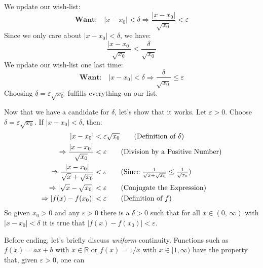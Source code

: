 \documentclass{article}
\theoremstyle{normal}
\theoremstyle{plain}
\begin{document}
    We update our wish-list:
    \begin{equation}
        \textbf{Want:}\quad
        |x-x_{0}|<\delta
        \Rightarrow
        \frac{|x-x_{0}|}{\sqrt{x_{0}}}<\varepsilon
    \end{equation}
    Since we only care about $|x-x_{0}|<\delta$, we have:
    \begin{equation}
        \frac{|x-x_{0}|}{\sqrt{x_{0}}}<\frac{\delta}{\sqrt{x_{0}}}
    \end{equation}
    We update our wish-list one last time:
    \begin{equation}
        \textbf{Want:}\quad
        |x-x_{0}|<\delta
        \Rightarrow
        \frac{\delta}{\sqrt{x_{0}}}\leq\varepsilon
    \end{equation}
    Choosing $\delta=\varepsilon\sqrt{x_{0}}$ fulfills everything on our list.
    \par\hfill\par
    Now that we have a candidate for $\delta$, let's show that it works.
    Let $\varepsilon>0$. Choose $\delta=\varepsilon\sqrt{x_{0}}$. If
    $|x-x_{0}|<\delta$, then:
    \begin{align}
        |x-x_{0}|&<\varepsilon\sqrt{x_{0}}
            \tag{Definition of $\delta$}\\
        \Rightarrow
            \frac{|x-x_{0}|}{\sqrt{x_{0}}}&<\varepsilon
                \tag{Division by a Positive Number}\\
        \Rightarrow
            \frac{|x-x_{0}|}{\sqrt{x}+\sqrt{x_{0}}}&<\varepsilon
                \tag{%
                    Since
                    $\frac{1}{\sqrt{x}+\sqrt{x_{0}}}\leq\frac{1}{\sqrt{x_{0}}}$%
                }\\
        \Rightarrow
            |\sqrt{x}-\sqrt{x_{0}}|&<\varepsilon
                \tag{Conjugate the Expression}\\
        \Rightarrow
            |f(x)-f(x_{0})|&<\varepsilon
                \tag{Definition of $f$}
    \end{align}
    So given $x_{0}>0$ and any $\varepsilon>0$ there is a $\delta>0$ such
    that for all $x\in(0,\,\infty)$ with $|x-x_{0}|<\delta$ it is true that
    $|f(x)-f(x_{0})|<\varepsilon$.
    \par\hfill\par
    Before ending, let's briefly discuss \textit{uniform} continuity. Functions
    such as $f(x)=ax+b$ with $x\in\mathbb{R}$ or $f(x)=1/x$ with
    $x\in[1,\infty)$ have the property that, given $\varepsilon>0$, one can
\end{document}
